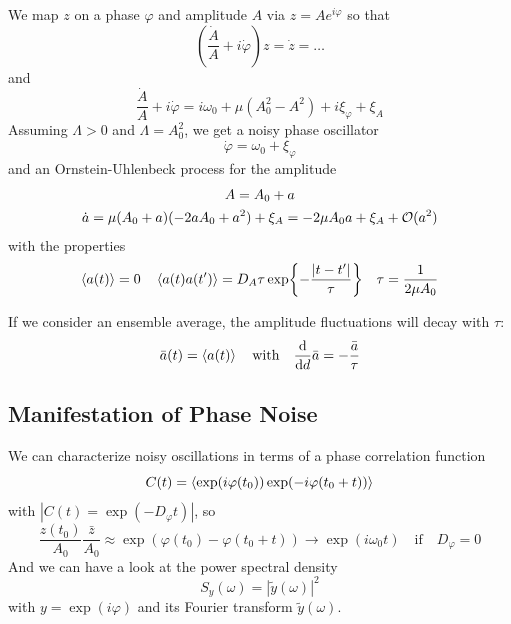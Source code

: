 \documentclass{notebook}
\begin{document}
We map $z$ on a phase $\varphi$ and amplitude $A$ via $z = A e^{i \varphi}$ so that
%
\begin{equation}
\left( \frac{\dot{A}}{A} + i \dot{\varphi} \right) z = \dot{z} = \dots
\end{equation}
%
and
%
\begin{equation}
\frac{\dot{A}}{A} + i \dot{\varphi} = i \omega_0 + \mu(A_0^2- A^2) + i \xi_{\varphi} + \xi_A
\end{equation}
%
Assuming $\Lambda > 0$ and $\Lambda = A_0^2$, we get a noisy phase oscillator
%
\begin{equation}
\dot{\varphi} = \omega_0 + \xi_{\varphi}
\end{equation}
%
and an Ornstein-Uhlenbeck process for the amplitude
%
%
\begin{equation}
%
\begin{gathered}
A = A_0 + a \\
\dot{a} = \mu(A_0 + a)(-2 a A_0 + a^2) + \xi_A = -2\mu A_0 a + \xi_A + \O{a^2}
\end{gathered}
%
\end{equation}
%
with the properties
%
\begin{equation*}
	\expval{a(t)} = 0 \quad \expval{a(t)a(t')} = D_A \tau \exp{- \frac{|t-t'|}{\tau}} \quad \tau = \frac{1}{2 \mu A_0}
\end{equation*}
%
\begin{remark}[Remark]
	If we consider an ensemble average, the amplitude fluctuations will decay with $\tau$: 
	\begin{equation*}
		\bar{a}(t) = \expval{a(t)} \quad \mathrm{with} \quad \dv{d} \bar{a} = - \frac{\bar{a}}{\tau}
	\end{equation*}
\end{remark}

\subsection*{Manifestation of Phase Noise}

We can characterize noisy oscillations in terms of a phase correlation function
%
\begin{equation}
C(t) = \expval{\exp(i \varphi(t_0)) \exp(-i \varphi(t_0 + t))}
\end{equation}
%
with $|C(t) = \exp(-D_{\varphi} t)|$, so
%
\begin{equation*}
	\frac{z(t_0)}{A_0} \frac{\bar{z}}{A_0} \approx \exp(\varphi(t_0)-\varphi(t_0+t)) \to \exp(i \omega_0 t) \quad \mathrm{if} \quad D_{\varphi} = 0
\end{equation*}
%
And we can have a look at the power spectral density 
%
\begin{equation}
S_y(\omega) = |\tilde{y}(\omega)|^2
\end{equation}
%
with $y = \exp(i \varphi)$ and its Fourier transform $\tilde{y}(\omega)$. 
\end{document}
